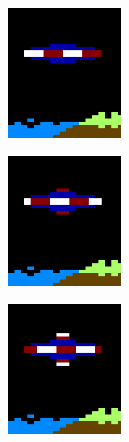 \begin{figure}[H]
  {
    \setlength{\tabcolsep}{3.0pt}
    \setlength\cmidrulewidth{\heavyrulewidth} %
	\centering
	\begin{subfigure}{0.3\textwidth}
    \includegraphics[width=3cm]{src/sprites/gallery/sprite_160.png}%
	\centering
	\end{subfigure}
	\begin{subfigure}{0.3\textwidth}
    \includegraphics[width=3cm]{src/sprites/gallery/sprite_161.png}%
	\end{subfigure}
	\centering
	\begin{subfigure}{0.3\textwidth}
    \includegraphics[width=3cm]{src/sprites/gallery/sprite_162.png}%
	\end{subfigure}
  }

  {
  \setlength{\tabcolsep}{3.0pt}
  \setlength\cmidrulewidth{\heavyrulewidth} %
  \begin{adjustbox}{width=13cm}


\end{adjustbox}}
\end{figure}
